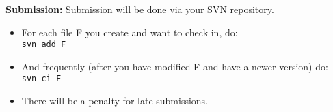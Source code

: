 \documentclass{article}
\begin{document}
\textbf{Submission:}
Submission will be done via your SVN repository.
\begin{itemize}
\item  For each file F you create and want to check in, do:\\
        \texttt{svn add F}
\item  And frequently (after you have modified F and have a newer version) do:\\
        \texttt{svn ci F}
\item  There will be a penalty for late submissions.
\end{itemize}
\end{document}
